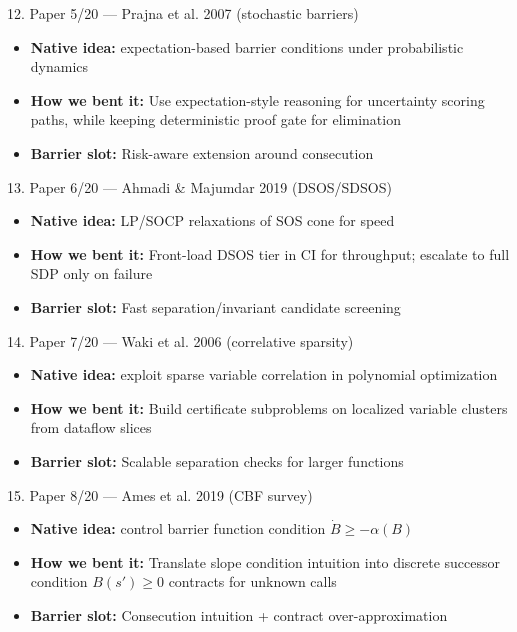 \documentclass[aspectratio=169]{beamer}
\newcommand{\bendtag}[1]{\textcolor{blue!70!black}{\textbf{How we bent it:} #1}}
\newcommand{\slottag}[1]{\textcolor{teal!70!black}{\textbf{Barrier slot:} #1}}
\begin{document}
\begin{frame}[t,shrink=8]{12. Paper 5/20 — Prajna et al. 2007 (stochastic barriers)}
\begin{itemize}
  \item \textbf{Native idea:} expectation-based barrier conditions under probabilistic dynamics
  \item \bendtag{Use expectation-style reasoning for uncertainty scoring paths, while keeping deterministic proof gate for elimination}
  \item \slottag{Risk-aware extension around consecution}
\end{itemize}
\end{frame}

\begin{frame}[t,shrink=8]{13. Paper 6/20 — Ahmadi \& Majumdar 2019 (DSOS/SDSOS)}
\begin{itemize}
  \item \textbf{Native idea:} LP/SOCP relaxations of SOS cone for speed
  \item \bendtag{Front-load DSOS tier in CI for throughput; escalate to full SDP only on failure}
  \item \slottag{Fast separation/invariant candidate screening}
\end{itemize}
\end{frame}

\begin{frame}[t,shrink=8]{14. Paper 7/20 — Waki et al. 2006 (correlative sparsity)}
\begin{itemize}
  \item \textbf{Native idea:} exploit sparse variable correlation in polynomial optimization
  \item \bendtag{Build certificate subproblems on localized variable clusters from dataflow slices}
  \item \slottag{Scalable separation checks for larger functions}
\end{itemize}
\end{frame}

\begin{frame}[t,shrink=8]{15. Paper 8/20 — Ames et al. 2019 (CBF survey)}
\begin{itemize}
  \item \textbf{Native idea:} control barrier function condition \(\dot{B}\ge-\alpha(B)\)
  \item \bendtag{Translate slope condition intuition into discrete successor condition \(B(s')\ge0\) contracts for unknown calls}
  \item \slottag{Consecution intuition + contract over-approximation}
\end{itemize}
\end{frame}
\end{document}
